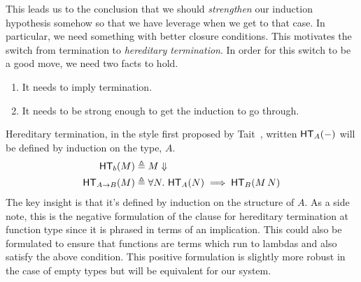 \documentclass{article}
\begin{document}
This leads us to the conclusion that we should \emph{strengthen} our
induction hypothesis somehow so that we have leverage when we get to
that case. In particular, we need something with better closure
conditions. This motivates the switch from termination to
\emph{hereditary termination}. In order for this switch to be a good
move, we need two facts to hold.
\begin{enumerate}
\item It needs to imply termination.
\item It needs to be strong enough to get the induction to go through.
\end{enumerate}
Hereditary termination, in the style first proposed by
Tait~\citep{Tait:67}, written $\mathsf{HT}_{A}(-)$ will be defined by
induction on the type, $A$.
\begin{align*}
  \mathsf{HT}_{b}(M) &\triangleq M \Downarrow\\
  \mathsf{HT}_{A \to B}(M) &\triangleq
  \forall N.\ \mathsf{HT}_{A}(N) \implies \mathsf{HT}_{B}(M\,N)
\end{align*}
The key insight is that it's defined by induction on the structure of
$A$. As a side note, this is the negative formulation of the clause
for hereditary termination at function type since it is phrased in terms of an implication. This could also be
formulated to ensure that functions are terms which run to lambdas and
also satisfy the above condition. This positive formulation is
slightly more robust in the case of empty types but will be equivalent
for our system.
\end{document}
